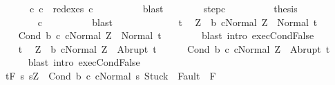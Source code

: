 \begin{isabellebody}
\ \ \ \ \ \ \ \ c{}{\isacharcolon}\ {\isachardoublequoteopen}c{}\ {\isasymin}\ redexes\ c{\isacharprime}{\isacharprime}{\isachardoublequoteclose}\isanewline
\ \ \ \ \ \ \ \ \isamarkupfalse%
\ blast\isanewline
\ \ \ \ \ \ \isamarkupfalse%
\ step{\isacharunderscore}c{\isacharprime}{\isacharprime}\isanewline
\ \ \ \ \ \ \isamarkupfalse%
\ \isamarkupfalse%
\ {\isacharquery}thesis\isanewline
\ \ \ \ \ \ \ \ \isamarkupfalse%
\ c{}\isanewline
\ \ \ \ \ \ \ \ \isamarkupfalse%
\ blast\isanewline
\ \ \ \ \isamarkupfalse%
\isanewline
\ \ \isamarkupfalse%
\isanewline
\ \ \ \ \isamarkupfalse%
\ t\ \isamarkupfalse%
\ {\isachardoublequoteopen}Z\ {\isasymnotin}\ b{\isachardoublequoteclose}\ {\isachardoublequoteopen}{\isasymGamma}{\isasymturnstile}{\isasymlangle}c{}{\isacharcomma}Normal\ Z{\isasymrangle}\ {\isasymRightarrow}\ Normal\ t{\isachardoublequoteclose}\isanewline
\ \ \ \ \isamarkupfalse%
\ {\isachardoublequoteopen}{\isasymGamma}{\isasymturnstile}{\isasymlangle}Cond\ b\ c{}\ c{}{\isacharcomma}Normal\ Z{\isasymrangle}\ {\isasymRightarrow}\ Normal\ t{\isachardoublequoteclose}\isanewline
\ \ \ \ \ \ \isamarkupfalse%
\ {\isacharparenleft}blast\ intro{\isacharcolon}\ exec{\isachardot}CondFalse{\isacharparenright}\isanewline
\ \ \isamarkupfalse%
\isanewline
\ \ \ \ \isamarkupfalse%
\ t\ \isamarkupfalse%
\ {\isachardoublequoteopen}Z\ {\isasymnotin}\ b{\isachardoublequoteclose}\ {\isachardoublequoteopen}{\isasymGamma}{\isasymturnstile}{\isasymlangle}c{}{\isacharcomma}Normal\ Z{\isasymrangle}\ {\isasymRightarrow}\ Abrupt\ t{\isachardoublequoteclose}\isanewline
\ \ \ \ \isamarkupfalse%
\ {\isachardoublequoteopen}{\isasymGamma}{\isasymturnstile}{\isasymlangle}Cond\ b\ c{}\ c{}{\isacharcomma}Normal\ Z{\isasymrangle}\ {\isasymRightarrow}\ Abrupt\ t{\isachardoublequoteclose}\isanewline
\ \ \ \ \ \ \isamarkupfalse%
\ {\isacharparenleft}blast\ intro{\isacharcolon}\ exec{\isachardot}CondFalse{\isacharparenright}\isanewline
\ \ \isamarkupfalse%
\isanewline
\ \ \isamarkupfalse%
\isanewline
\ \ \isamarkupfalse%
\ \isanewline
\ \ \ {\isachardoublequoteopen}{\isasymGamma}{\isacharcomma}{\isasymTheta}{\isasymturnstile}\isactrlsub t\isactrlbsub {\isacharslash}F\isactrlesub \ {\isacharbraceleft}s{\isachardot}\ s{\isacharequal}Z\ {\isasymand}\ {\isasymGamma}{\isasymturnstile}{\isasymlangle}Cond\ b\ c{}\ c{}{\isacharcomma}Normal\ s{\isasymrangle}\ {\isasymRightarrow}{\isasymnotin}{\isacharparenleft}{\isacharbraceleft}Stuck{\isacharbraceright}\ {\isasymunion}\ Fault\ {\isacharbackquote}\ {\isacharparenleft}{\isacharminus}F{\isacharparenright}{\isacharparenright}\ {\isasymand}\ \isanewline

\end{isabellebody}
